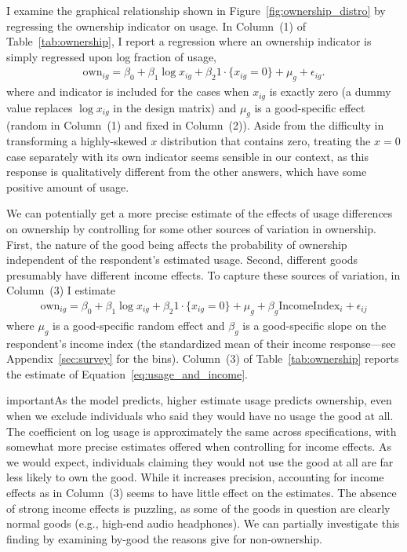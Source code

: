 \documentclass[11pt]{article}
\begin{document}
I examine the graphical relationship shown in Figure~\ref{fig:ownership_distro} by regressing the ownership indicator on usage. 
In Column~(1) of Table~\ref{tab:ownership}, I report a regression where an ownership indicator is simply regressed upon log fraction of usage,  
\begin{align} \label{eq:base_own}
\mbox{own}_{ig} = \beta_0 + \beta_1 \log x_{ig} + \beta_2 1\cdot\{x_{ig} = 0\} + \mu_{g} + \epsilon_{ig}.
\end{align} 
where and indicator is included for the cases when $x_{ig}$ is exactly zero (a dummy value replaces $\log x_{ig}$ in the design matrix) and $\mu_g$ is a good-specific effect (random in Column~(1) and fixed in Column~(2)).
Aside from the difficulty in transforming a highly-skewed $x$ distribution that contains zero, treating the $x = 0$ case separately with its own indicator seems sensible in our context, as this response is qualitatively different from the other answers, which have some positive amount of usage.  

We can potentially get a more precise estimate of the effects of usage differences on ownership by controlling for some other sources of variation in ownership. 
First, the nature of the good being affects the probability of ownership independent of the respondent's estimated usage. 
Second, different goods presumably have different income effects.  
To capture these sources of variation, in Column~(3) I estimate  
\begin{align} \label{eq:usage_and_income}
\mbox{own}_{ig} = \beta_0 + \beta_1 \log x_{ig} + \beta_2 1\cdot\{x_{ig} = 0\} + \mu_g + \beta_g \mbox{IncomeIndex}_i + \epsilon_{ij}  
\end{align} 
where $\mu_g$ is a good-specific random effect and $\beta_g$ is a good-specific slope on the respondent's income index (the standardized mean of their income response---see Appendix~\ref{sec:survey} for the bins). 
Column~(3) of Table~\ref{tab:ownership} reports the estimate of Equation~\ref{eq:usage_and_income}. 



important{As the model predicts, higher estimate usage predicts ownership, even when we exclude individuals who said they would have no usage the good at all.} 
The coefficient on log usage is approximately the same across specifications, with somewhat more precise estimates offered when controlling for income effects. 
As we would expect, individuals claiming they would not use the good at all are far less likely to own the good. 
While it increases precision, accounting for income effects as in Column~(3) seems to have little effect on the estimates. 
The absence of strong income effects is puzzling, as some of the goods in question are clearly normal goods (e.g., high-end audio headphones). 
We can partially investigate this finding by examining by-good the reasons give for non-ownership. 
\end{document}
